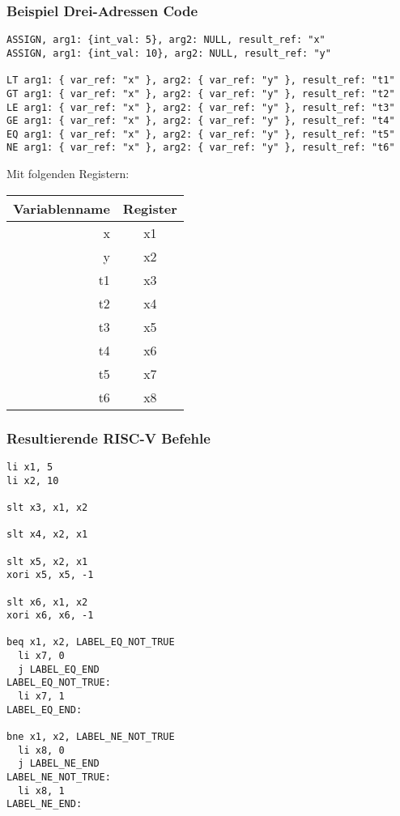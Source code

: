 \subsubsection{Beispiel Drei-Adressen Code}

\begin{lstlisting}
ASSIGN, arg1: {int_val: 5}, arg2: NULL, result_ref: "x"
ASSIGN, arg1: {int_val: 10}, arg2: NULL, result_ref: "y"

LT arg1: { var_ref: "x" }, arg2: { var_ref: "y" }, result_ref: "t1"
GT arg1: { var_ref: "x" }, arg2: { var_ref: "y" }, result_ref: "t2"
LE arg1: { var_ref: "x" }, arg2: { var_ref: "y" }, result_ref: "t3"
GE arg1: { var_ref: "x" }, arg2: { var_ref: "y" }, result_ref: "t4"
EQ arg1: { var_ref: "x" }, arg2: { var_ref: "y" }, result_ref: "t5"
NE arg1: { var_ref: "x" }, arg2: { var_ref: "y" }, result_ref: "t6"
\end{lstlisting}

Mit folgenden Registern:

\begin{table}[H]
	\begin{center}
		\begin{tabular}{| r | c |}
			\hline
			Variablenname & Register \\
			\hline
			x & x1 \\
			y & x2 \\
			t1 & x3 \\
			t2 & x4 \\
			t3 & x5 \\
			t4 & x6 \\
			t5 & x7 \\
			t6 & x8 \\
			\hline
		\end{tabular}
	\end{center}
\end{table}

\subsubsection{Resultierende RISC-V Befehle}

\begin{lstlisting}
li x1, 5
li x2, 10

slt x3, x1, x2

slt x4, x2, x1

slt x5, x2, x1
xori x5, x5, -1

slt x6, x1, x2
xori x6, x6, -1

beq x1, x2, LABEL_EQ_NOT_TRUE
  li x7, 0
  j LABEL_EQ_END
LABEL_EQ_NOT_TRUE:
  li x7, 1
LABEL_EQ_END:

bne x1, x2, LABEL_NE_NOT_TRUE
  li x8, 0
  j LABEL_NE_END
LABEL_NE_NOT_TRUE:
  li x8, 1
LABEL_NE_END:
\end{lstlisting}

